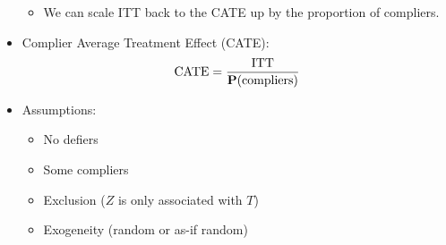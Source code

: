 \documentclass[10pt, letterpaper]{article}
\def\P{\vb{P}}
\def\CATE{\mathrm{CATE}}
\def\ITT{\mathrm{ITT}}
\begin{document}
\begin{multicols}{2}
\begin{itemize}
\begin{itemize}
		\item We can scale ITT back to the CATE up by the proportion of compliers.
	\end{itemize}
	\item Complier Average Treatment Effect (CATE): \[\CATE=\dfrac{\ITT}{\P(\mathrm{compliers})}\]
	\item Assumptions:
	\begin{itemize}
		\item No defiers
		\item Some compliers
		\item Exclusion ($Z$ is only associated with $T$)
		\item Exogeneity (random or as-if random)
	\end{itemize}
\end{itemize}


\end{multicols}
\end{document}
